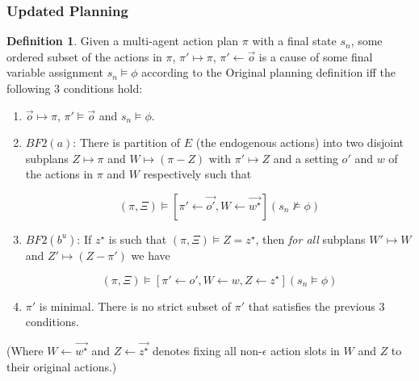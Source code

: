 \documentclass{article}
\theoremstyle{plain}
\theoremstyle{definition}
\newtheorem{defn}[thm]{Definition} %
\begin{document}
\subsubsection*{Updated Planning}
\begin{defn}
Given a multi-agent action plan $\pi$ with a final state $s_n$, some ordered subset of the actions in $\pi$, $\pi' \mapsto \pi$, $\pi' \leftarrow \vec{o}$ is a cause of some final variable assignment $s_n \models \phi$ according to the Original planning definition iff the following 3 conditions hold:
\begin{enumerate}
\item  $\vec{o} \mapsto \pi$, $\pi' \models \vec{o}$ and $s_n \models \phi$.



\item $BF2(a)$: There is partition of $E$ (the endogenous actions) into two disjoint subplans $Z \mapsto \pi$ and $W \mapsto (\pi - Z)$ with $\pi' \mapsto Z$ and a setting $o'$ and $w$ of the actions in $\pi$ and $W$ respectively such that

\[
(\pi, \Xi) \models [\pi' \leftarrow \vec{o'}, W \leftarrow \vec{w^\star}](s_n \not\models \phi)
\]

\item $BF2(b^u)$: If $z^\star$ is such that $(\pi, \Xi) \models Z = z^\star$, then \textit{for all} subplans $W' \mapsto W$ and $Z' \mapsto (Z - \pi')$ we have

\[
(\pi, \Xi) \models [\pi' \leftarrow o', W \leftarrow w, Z \leftarrow z^\star](s_n \models \phi)
\]

\item $\pi'$ is minimal. There is no strict subset of $\pi'$ that satisfies the previous 3 conditions.
\end{enumerate}
\end{defn}

(Where $W\leftarrow \vec{w^\star}$ and $Z\leftarrow \vec{z^\star}$ denotes fixing all non-$\epsilon$ action slots in $W$ and $Z$ to their original actions.)
\end{document}
